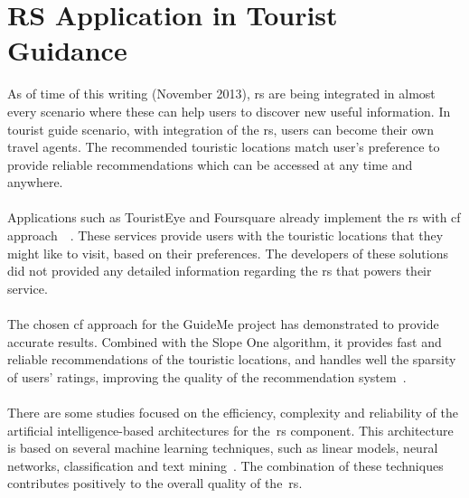 \section{RS Application in Tourist Guidance}
\label{sec:rsInTouristGuides}
As of time of this writing (November 2013), \gls{rs} are being integrated in almost every scenario where these can help users to discover new useful information. In tourist guide scenario, with integration of the \gls{rs}, users can become their own travel agents. The recommended touristic locations match user's preference to provide reliable recommendations which can be accessed at any time and anywhere.\\
\\
Applications such as TouristEye and Foursquare already implement the \gls{rs} with \gls{cf} approach~\cite{foursqureRecommendationEngine}~\cite{tourisEyeRecommender}. These services provide users with the touristic locations that they might like to visit, based on their preferences. The developers of these solutions did not provided any detailed information regarding the \gls{rs} that powers their service.\\
\\
The chosen \gls{cf} approach for the GuideMe project has demonstrated to provide accurate results. Combined with the Slope One algorithm, it provides fast and reliable recommendations of the touristic locations, and handles well the sparsity of users’ ratings, improving the quality of the recommendation system~\cite{itemBasedSlopeOne}.\\
\\
There are some studies focused on the efficiency, complexity and reliability of the artificial intelligence-based architectures for the~\gls{rs} component. This architecture is based on several machine learning techniques, such as linear models, neural networks, classification and text mining~\cite{intelligenHybrid}. The combination of these techniques contributes positively to the overall quality of the~\gls{rs}.
